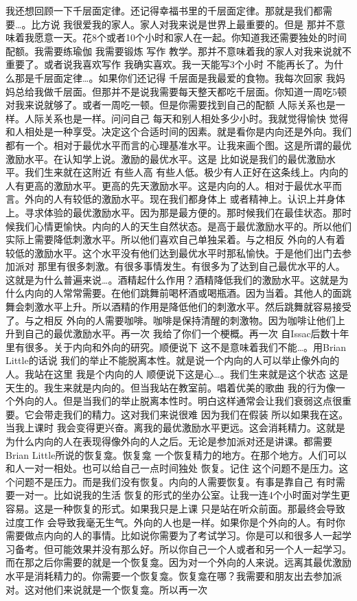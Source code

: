 我还想回顾一下千层面定律。还记得幸福书里的千层面定律。那就是我们都需要…。比方说 我很爱我的家人。家人对我来说是世界上最重要的。但是 那并不意味着我愿意一天。花8个或者10个小时和家人在一起。你知道我还需要独处的时间配额。我需要练瑜伽 我需要锻炼 写作 教学。那并不意味着我的家人对我来说就不重要了。或者说我喜欢写作 我确实喜欢。我一天能写3个小时 不能再长了。为什么那是千层面定律…。如果你们还记得 千层面是我最爱的食物。我每次回家 我妈妈总给我做千层面。但那并不是说我需要每天整天都吃千层面。你知道一周吃5顿对我来说就够了。或者一周吃一顿。但是你需要找到自己的配额 人际关系也是一样。人际关系也是一样。问问自己 每天和别人相处多少小时。我就觉得愉快 觉得和人相处是一种享受。决定这个合适时间的因素。就是看你是内向还是外向。我们都有一个。相对于最优水平而言的心理基准水平。让我来画个图。这是所谓的最优激励水平。在认知学上说。激励的最优水平。这是 比如说是我们的最优激励水平。我们生来就在这附近 有些人高 有些人低。极少有人正好在这条线上。内向的人有更高的激励水平。更高的先天激励水平。这是内向的人。相对于最优水平而言。外向的人有较低的激励水平。现在我们都身体上 或者精神上。认识上并身体上。寻求体验的最优激励水平。因为那是最方便的。那时候我们在最佳状态。那时候我们心情更愉快。内向的人的天生自然状态。是高于最优激励水平的。所以他们实际上需要降低刺激水平。所以他们喜欢自己单独呆着。与之相反 外向的人有着较低的激励水平。这个水平没有他们达到最优水平时那私愉快。于是他们出门去参加派对 那里有很多刺激。有很多事情发生。有很多为了达到自己最优水平的人。这就是为什么普遍来说…。酒精起什么作用？酒精降低我们的激励水平。这就是为什么内向的人常常需要。在他们跳舞前喝杯酒或喝瓶酒。因为当着。其他人的面跳舞会刺激水平上升。所以酒精的作用是降低他们的刺激水平。然后跳舞就容易接受了。与之相反 外向的人需要咖啡。咖啡是保持清醒的刺激物。因为咖啡让他们上升到自己的最优激励水平。再一次 我给了你们一个梗概。再一次 自Issac后数十年里有很多。关于内向和外向的研究。顺便说下 这不是意味着我们不能…。用Brian Little的话说 我们的举止不能脱离本性。就是说一个内向的人可以举止像外向的人。我站在这里 我是个内向的人 顺便说下这是心…。我们生来就是这个状态 这是天生的。我生来就是内向的。但当我站在教室前。唱着优美的歌曲 我的行为像一个外向的人。但是当我们的举止脱离本性时。明白这样通常会让我们衰弱这点很重要。它会带走我们的精力。这对我们来说很难 因为我们在假装 所以如果我在这。当我上课时 我会变得更兴奋。离我的最优激励水平更远。这会消耗精力。这就是为什么内向的人在表现得像外向的人之后。无论是参加派对还是讲课。都需要Brian Little所说的恢复龛。恢复龛 一个恢复精力的地方。在那个地方。人们可以和人一对一相处。也可以给自己一点时间独处 恢复。记住 这个问题不是压力。这个问题不是压力。而是我们没有恢复。内向的人需要恢复。有事是靠自己 有时需要一对一。比如说我的生活 恢复的形式的坐办公室。让我一连4个小时面对学生更容易。这是一种恢复的形式。如果我只是上课 只是站在听众前面。那最终会导致过度工作 会导致我毫无生气。外向的人也是一样。如果你是个外向的人。有时你需要做点内向的人的事情。比如说你需要为了考试学习。你是可以和很多人一起学习备考。但可能效果并没有那么好。所以你自己一个人或者和另一个人一起学习。而在那之后你需要的就是一个恢复龛。因为对一个外向的人来说。远离其最优激励水平是消耗精力的。你需要一个恢复龛。恢复龛在哪？我需要和朋友出去参加派对。这对他们来说就是一个恢复龛。所以再一次 